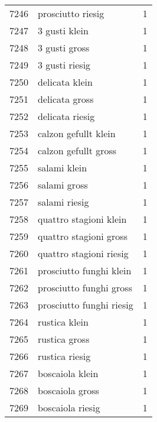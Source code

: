 \begin{tabular}{llr}
7246 &                                  prosciutto riesig &      1 \\
7247 &                                      3 gusti klein &      1 \\
7248 &                                      3 gusti gross &      1 \\
7249 &                                     3 gusti riesig &      1 \\
7250 &                                     delicata klein &      1 \\
7251 &                                     delicata gross &      1 \\
7252 &                                    delicata riesig &      1 \\
7253 &                               calzon gefullt klein &      1 \\
7254 &                               calzon gefullt gross &      1 \\
7255 &                                       salami klein &      1 \\
7256 &                                       salami gross &      1 \\
7257 &                                      salami riesig &      1 \\
7258 &                             quattro stagioni klein &      1 \\
7259 &                             quattro stagioni gross &      1 \\
7260 &                            quattro stagioni riesig &      1 \\
7261 &                            prosciutto funghi klein &      1 \\
7262 &                            prosciutto funghi gross &      1 \\
7263 &                           prosciutto funghi riesig &      1 \\
7264 &                                      rustica klein &      1 \\
7265 &                                      rustica gross &      1 \\
7266 &                                     rustica riesig &      1 \\
7267 &                                    boscaiola klein &      1 \\
7268 &                                    boscaiola gross &      1 \\
7269 &                                   boscaiola riesig &      1 \\

\end{tabular}
